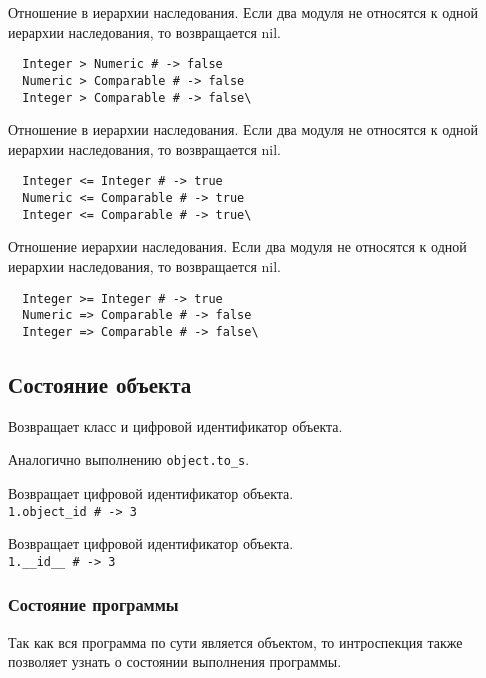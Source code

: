\begin{methodlist}
  Отношение в иерархии наследования. Если два модуля не относятся к одной иерархии наследования, то возвращается nil.
  \begin{verbatim}
  Integer > Numeric # -> false
  Numeric > Comparable # -> false
  Integer > Comparable # -> false\
  \end{verbatim}

  Отношение в иерархии наследования. Если два модуля не относятся к одной иерархии наследования, то возвращается nil.
  \begin{verbatim}
  Integer <= Integer # -> true 
  Numeric <= Comparable # -> true
  Integer <= Comparable # -> true\
  \end{verbatim}

  Отношение иерархии наследования. Если два модуля не относятся к одной иерархии наследования, то возвращается nil.
  \begin{verbatim}
  Integer >= Integer # -> true 
  Numeric => Comparable # -> false
  Integer => Comparable # -> false\
  \end{verbatim}
\end{methodlist}

\subsection{Состояние объекта}

\begin{methodlist}
  Возвращает класс и цифровой идентификатор объекта.

  Аналогично выполнению \verb!object.to_s!. 

  Возвращает цифровой идентификатор объекта. 
  \\\verb!1.object_id # -> 3!
 
  \declare{object.__id__}{\# -> integer} 
  Возвращает цифровой идентификатор объекта.
  \\\verb!1.__id__ # -> 3!
\end{methodlist}

\subsubsection*{Состояние программы}

Так как вся программа по сути является объектом, то интроспекция также позволяет узнать о состоянии выполнения программы.

